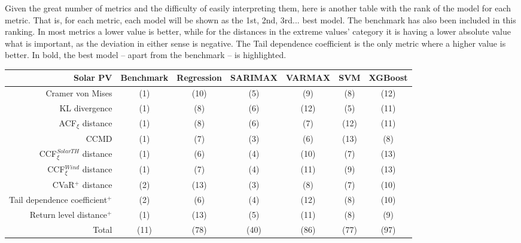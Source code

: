 Given the great number of metrics and the difficulty of easily interpreting them, here is another table with the rank of the model for each metric. That is, for each metric, each model will be shown as the 1st, 2nd, 3rd... best model. The benchmark has also been included in this ranking. In most metrics a lower value is better, while for the distances in the extreme values' category it is having a lower absolute value what is important, as the deviation in either sense is negative. The Tail dependence coefficient is the only metric where a higher value is better. In bold, the best model -- apart from the benchmark -- is highlighted. 
\newpage
\begin{table}[ht]
    \footnotesize
    \begin{tabular}[l]{r|c|ccc|cc|}
        \toprule
        \textbf{Solar PV} &Benchmark&Regression&SARIMAX&VARMAX&SVM&XGBoost \\
        \midrule            
        Cramer von Mises&(1)&(10)&(5)&(9)&(8)&(12) \\
        KL divergence&(1)&(8)&(6)&(12)&(5)&(11) \\
        ACF$_\xi$ distance&(1)&(8)&(6)&(7)&(12)&(11) \\
        \midrule
        CCMD&(1)&(7)&(3)&(6)&(13)&(8) \\
        CCF$_\xi^{Solar TH}$ distance&(1)&(6)&(4)&(10)&(7)&(13) \\
        CCF$_\xi^{Wind}$ distance&(1)&(7)&(4)&(11)&(9)&(13) \\
        \midrule
        CVaR$^+$ distance&(2)&(13)&(3)&(8)&(7)&(10) \\
        Tail dependence coefficient$^+$&(2)&(6)&(4)&(12)&(8)&(10) \\
        Return level distance$^+$&(1)&(13)&(5)&(11)&(8)&(9) \\
        \bottomrule
        Total&(11)&(78)&(40)&(86)&(77)&(97) \\
        \bottomrule
    \end{tabular}
\end{table}
